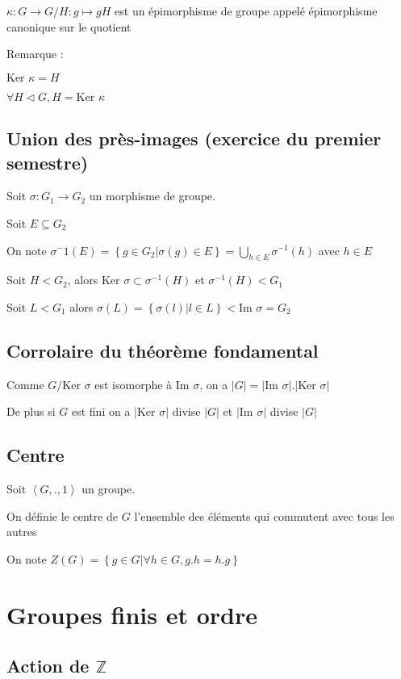 \documentclass[a4paper,10pt]{article}
\newcommand{\card}[1]{\left\vert #1 \right\vert}
\newcommand{\Ker}{\mbox{Ker }}
\newcommand{\im}{\mbox{Im }}
\newcommand{\grp}[1]{\left\langle #1 \right\rangle}
\newcommand{\ap}{\rightarrow}
\newcommand{\Z}{\mathbb{Z}}
\newcommand{\tset}[1]{\left\lbrace #1 \right\rbrace}
\newcommand{\normal}{\triangleleft}
\begin{document}
$\kappa : G \ap G/H : g \mapsto gH$ est un épimorphisme de groupe appelé épimorphisme canonique sur le quotient

Remarque :

$\Ker \kappa = H$

$\forall H \normal G, H = \Ker \kappa$

\subsection{Union des près-images (exercice du premier semestre)}

Soit $\sigma : G_1 \ap G_2$ un morphisme de groupe.

Soit $E \subseteq G_2$

On note $\sigma^-1 (E) = \tset{g \in G_2 \vert \sigma(g) \in E} = \bigcup\limits_{h \in E} \sigma^{-1}(h)$ avec $h \in E$

Soit $H < G_2$, alors $\Ker \sigma \subset \sigma^{-1}(H)$ et $\sigma^{-1}(H) < G_1$

Soit $L < G_1$ alors $\sigma(L) = \tset{\sigma(l) \vert l \in L} < \im \sigma = G_2$

\subsection{Corrolaire du théorème fondamental}
Comme $G / \Ker \sigma$ est isomorphe à $\im \sigma$, on a $\card{G} = \card{\im \sigma} . \card{\Ker \sigma}$

De plus si $G$ est fini on a $\card{\Ker \sigma}$ divise $\card{G}$ et $\card{\im \sigma}$ divise $\card{G}$


\subsection{Centre}

Soit $\grp{G,.,1}$ un groupe.

On définie le centre de $G$ l'ensemble des éléments qui commutent avec tous les autres

On note $Z(G) = \tset{g \in G \vert \forall h \in G, g.h = h.g}$

\section{Groupes finis et ordre}

\subsection{Action de $\Z$}
\end{document}
